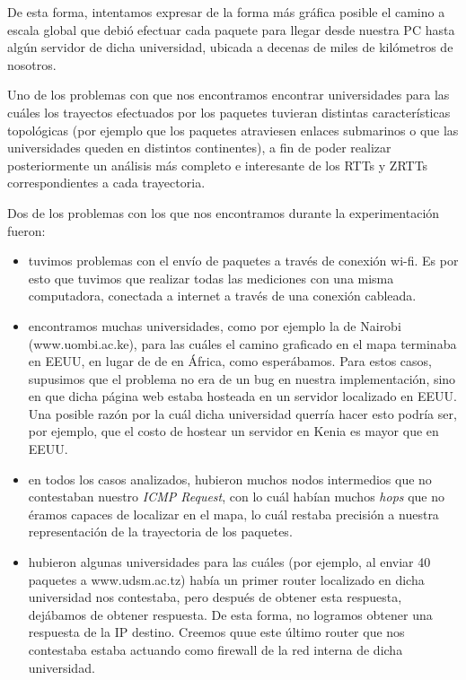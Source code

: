\documentclass[final,inline,a4paper,narroweqnarray]{ieee}
\begin{document}
De esta forma, intentamos expresar de la forma más gráfica posible el camino a
escala global que debió efectuar cada paquete para llegar desde nuestra PC hasta
algún servidor de dicha universidad, ubicada a decenas de miles de kilómetros de
nosotros.

Uno de los problemas con que nos encontramos encontrar universidades para las
cuáles los trayectos efectuados por los paquetes tuvieran distintas
características topológicas (por ejemplo que los paquetes atraviesen enlaces
submarinos o que las universidades queden en distintos continentes), a fin de
poder realizar posteriormente un análisis más completo e interesante de los RTTs
y ZRTTs correspondientes a cada trayectoria.

Dos de los problemas con los que nos encontramos durante la experimentación fueron:
\begin{itemize}

  \item tuvimos problemas con el envío de paquetes a través de conexión wi-fi.
  Es por esto que tuvimos que realizar todas las mediciones con una misma
  computadora, conectada a internet a través de una conexión cableada.

  \item encontramos muchas universidades, como por ejemplo la de Nairobi
  (www.uombi.ac.ke), para las cuáles el camino graficado en el mapa terminaba en
  EEUU, en lugar de de en África, como esperábamos. Para estos casos, supusimos
  que el problema no era de un bug en nuestra implementación, sino en que dicha
  página web estaba hosteada en un servidor localizado en EEUU. Una posible
  razón por la cuál dicha universidad querría hacer esto podría ser, por
  ejemplo, que el costo de hostear un servidor en Kenia es mayor que en EEUU.

  \item en todos los casos analizados, hubieron muchos nodos intermedios que no
  contestaban nuestro \emph{ICMP Request}, con lo cuál habían muchos \emph{hops}
  que no éramos capaces de localizar en el mapa, lo cuál restaba precisión a
  nuestra representación de la trayectoria de los paquetes.

  \item hubieron algunas universidades para las cuáles (por ejemplo, al enviar
  40 paquetes a www.udsm.ac.tz) había un primer router localizado en dicha
  universidad nos contestaba, pero después de obtener esta respuesta, dejábamos
  de obtener respuesta. De esta forma, no logramos obtener una respuesta de la
  IP destino. Creemos quue este último router que nos contestaba estaba actuando
  como firewall de la red interna de dicha universidad.
  \end{itemize}
\end{document}
